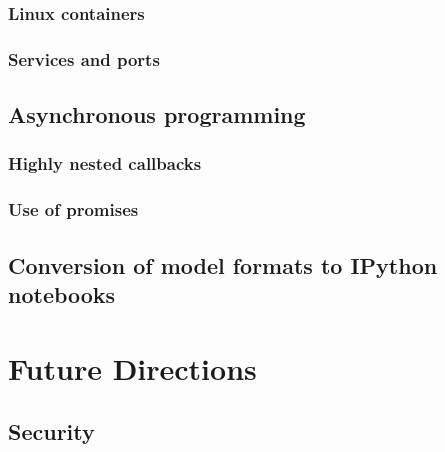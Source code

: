 \subsubsection{Linux containers}
\subsubsection{Services and ports}
\subsection{Asynchronous programming}
\subsubsection{Highly nested callbacks}
\subsubsection{Use of promises}
\subsection{Conversion of model formats to IPython notebooks}

\section{Future Directions}
\subsection{Security}
